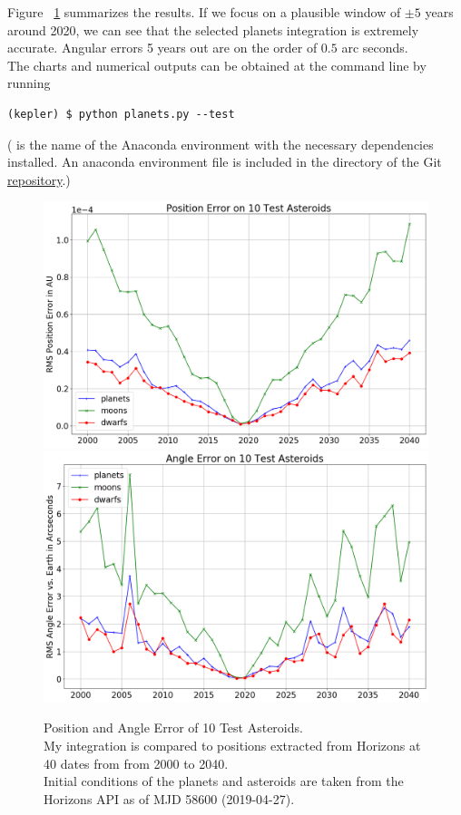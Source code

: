 Figure ~\ref{fig:AsteroidIntegrationErrorHorizons} summarizes the results.
If we focus on a plausible window of $\pm 5$ years around 2020, we can see that the selected planets integration is extremely accurate.
Angular errors 5 years out are on the order of $0.5$ arc seconds.\\
The charts and numerical outputs can be obtained at the command line by running
\begin{lstlisting}[style=CodeSnippet]
(kepler) $ python planets.py --test
\end{lstlisting}
( is the name of the Anaconda environment with the necessary dependencies installed.
An anaconda environment file  is included in the  directory of the Git 
\href{https://github.com/memanuel/kepler-sieve}{repository}.)
\begin{figure}[hbt!]
\begin{center}
\includegraphics[width=1.0\textwidth]{../figs/integration_test/planets/sim_pos_error_comp.png}
\includegraphics[width=1.0\textwidth]{../figs/integration_test/planets/sim_ang_error_comp.png}
\end{center}
\caption[Position and Angle Error of 10 Test Asteroids Initialized from Horizons]
{Position and Angle Error of 10 Test Asteroids. \\
My integration is compared to positions extracted from Horizons at 40 dates from from 2000 to 2040.\\
Initial conditions of the planets and asteroids are taken from the Horizons API as of MJD 58600 (2019-04-27).}
\label{fig:AsteroidIntegrationErrorHorizons}
\end{figure}


